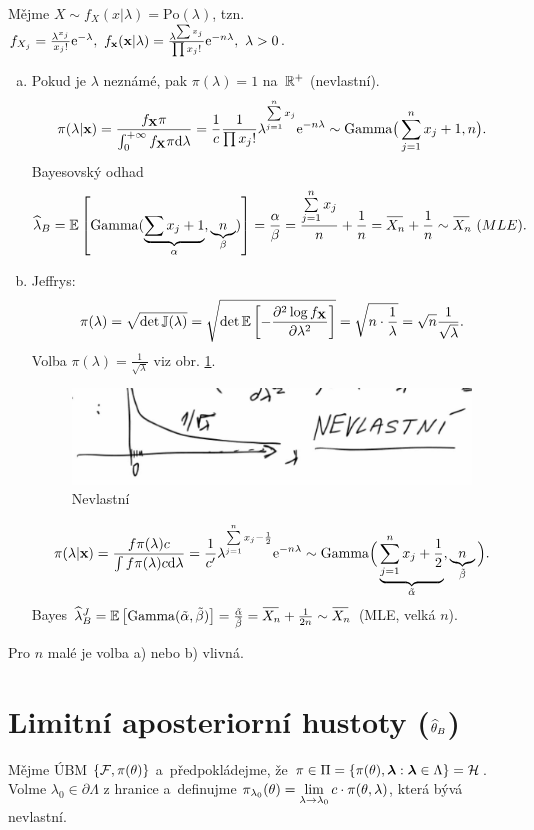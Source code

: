 \begin{example}
	Mějme $X\sim f_X(x|\lambda)=\mathrm{Po}(\lambda)$, tzn. $f_{X_j}=\frac{\lambda^{x_j}}{x_j!}\mathrm{e}^{-\lambda},~f_\textbf{x}(\textbf{x}|\lambda)=\frac{\lambda^{\sum x_j}}{\prod x_j!}\mathrm{e}^{-n\lambda},~\lambda>0$.\begin{enumerate}[a)]
		\item Pokud je $\lambda$ neznámé, pak $\pi(\lambda)=1$ na~$\mathbb{R}^+$ (nevlastní).
		$$
		\pi(\lambda|\textbf{x})=\frac{f_{\textbf{X}} \pi}{\int_{0}^{+\infty}f_{\textbf{X}}\pi\mathrm{d}\lambda}=\frac{1}{c}\frac{1}{\prod x_j!}\lambda^{\sum\limits_{j=1}^{n} x_j}\mathrm{e}^{-n\lambda}\sim\mathrm{Gamma}\big(\sum\limits_{j=1}^{n} x_j+1,n\big).$$
		Bayesovský odhad $$\widehat{\lambda}_B=\EE{\mathrm{Gamma}(\underbrace{\sum x_j+1}_{\alpha},\underbrace{n}_\beta)}=\frac{\alpha}{\beta}=\frac{\sumjn x_j}{n}+\frac{1}{n}=\Oxn+\frac{1}{n}\sim \Oxn~(MLE).$$
		\item Jeffrys: $$\pi(\lambda)=\sqrt{\det \mathbb{J}(\lambda)}=\sqrt{\det \mathbb{E}\left[ -\frac{\partial^2\log f_{\textbf{X}}}{\partial\lambda^2} \right]}=\sqrt{n\cdot\frac{1}{\lambda}}=\sqrt{n}\frac{1}{\sqrt{\lambda}}.$$
		Volba $\pi(\lambda)=\frac{1}{\sqrt{\lambda}}$ viz obr. \ref{fig:p72}.
		\begin{figure}[h]
			\centering
			\includegraphics[width=0.5\linewidth]{pictures/P7_2}
			\caption{Nevlastní}
			\label{fig:p72}
		\end{figure}
		$$ \pi(\lambda|\textbf{x})=\frac{f \pi(\lambda)c}{\int f\pi(\lambda)c\mathrm{d}\lambda}=\frac{1}{c'}\lambda^{\sum\limits_{j=1}^{n} x_j-\frac{1}{2}}\mathrm{e}^{-n\lambda}\sim\mathrm{Gamma}\Big(\underbrace{\sum\limits_{j=1}^{n} x_j+\frac{1}{2}}_{\tilde{\alpha}},\underbrace{n}_{\tilde{\beta}}\Big).$$
		Bayes $\widehat{\lambda}_B^J=\EE{\mathrm{Gamma}(\tilde{\alpha},\tilde{\beta})}=\frac{\tilde{\alpha}}{\tilde{\beta}}=\Oxn+\frac{1}{2n}\sim\Oxn$ (MLE, velká $n$).
	\end{enumerate}
	Pro $n$ malé je volba a) nebo b) vlivná.
\end{example}

\section{Limitní aposteriorní hustoty ($\widehat{\theta}_B$)}
Mějme ÚBM $\{\mathcal{F},\pi(\theta)\}$ a~předpokládejme, že $\pi\in\Pi=\{\pi(\theta),\boldsymbol{\lambda}:\boldsymbol{\lambda}\in\Lambda\}=\mathcal{H}$. Volme $\lambda_0\in\partial\Lambda$ z hranice a~definujme $\pi_{\lambda_0}(\theta)=\lim\limits_{\lambda\to\lambda_0}c\cdot \pi(\theta,\lambda)$, která bývá nevlastní. 

